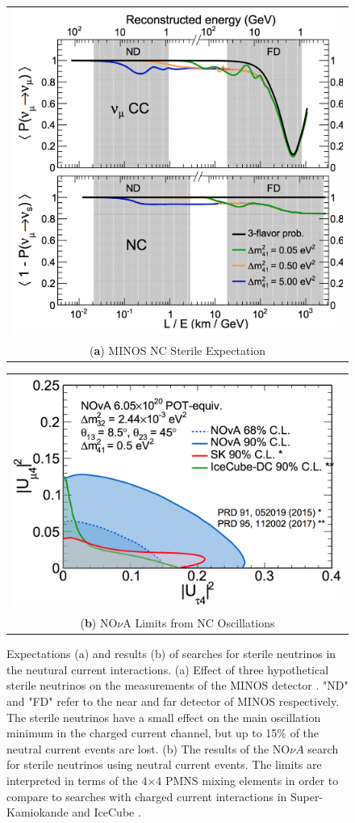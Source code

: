 \begin{figure}[h]
\centering
\begin{tabular}[b]{c}
  \includegraphics[width=0.45\linewidth]{minos_sterile_nc.png} \\
  \small (\textbf{\color{ctcolormain}a}) MINOS NC Sterile Expectation
\end{tabular} \hspace{2pt}
\begin{tabular}[b]{c}
  \includegraphics[width=0.45\linewidth]{nova_sterile_constraints.png} \\
  \small (\textbf{\color{ctcolormain}b}) NO${\nu}$A Limits from NC Oscillations
\end{tabular}
\caption[The MINOS and NO$\nu$A NC oscillation search results]{Expectations (a) and results (b) of searches for sterile neutrinos in the neutural current interactions. (a) Effect of three hypothetical sterile neutrinos on the measurements of the MINOS detector \cite{MINOS-SterileNC-2016}. "ND" and "FD" refer to the near and far detector of MINOS respectively. The sterile neutrinos have a small effect on the main oscillation minimum in the charged current channel, but up to 15\% of the neutral current events are lost. (b) The results of the NO${\nu}A$ search for sterile neutrinos using neutral current events. The limits are interpreted in terms of the 4$\times$4 PMNS mixing elements in order to compare to searches with charged current interactions in Super-Kamiokande \cite{SuperK-Steriles2015} and IceCube \cite{IceCubeSterile-Andrii}. }
\label{fig:nc_steriles}
\end{figure}

